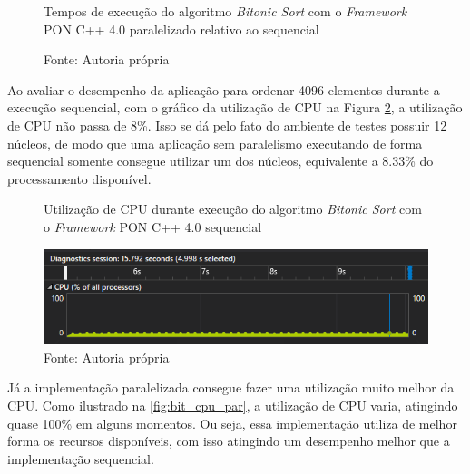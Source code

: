\begin{figure}[!htb]
  \centering
  \caption{Tempos de execução do algoritmo \textit{Bitonic Sort} com o \textit{Framework} PON C++ 4.0 paralelizado relativo ao sequencial}
  \caption*{Fonte: Autoria própria}
  \label{fig:bitonic_bench_rel}
  \end{figure}

Ao avaliar o desempenho da aplicação para ordenar 4096 elementos durante a
execução sequencial, com o gráfico da utilização de CPU na Figura
\ref{fig:bit_cpu}, a utilização de CPU não passa de 8\%. Isso se dá pelo fato do
ambiente de testes possuir 12 núcleos, de modo que uma aplicação sem paralelismo
executando de forma sequencial somente consegue utilizar um dos núcleos,
equivalente a 8.33\% do processamento disponível.

\begin{figure}[!htb]
\centering
\caption{Utilização de CPU durante execução do algoritmo \textit{Bitonic Sort}
com o \textit{Framework} PON C++ 4.0 sequencial}
\includegraphics[width=\textwidth]{../figures/cpu_bitonic.png}
\smallskip
\caption*{Fonte: Autoria própria}
\label{fig:bit_cpu}
\end{figure}

Já a implementação paralelizada consegue fazer uma utilização muito melhor da
CPU. Como ilustrado na \ref{fig:bit_cpu_par}, a utilização de CPU varia,
atingindo quase 100\% em alguns momentos. Ou seja, essa implementação utiliza de
melhor forma os recursos disponíveis, com isso atingindo um desempenho melhor
que a implementação sequencial.

